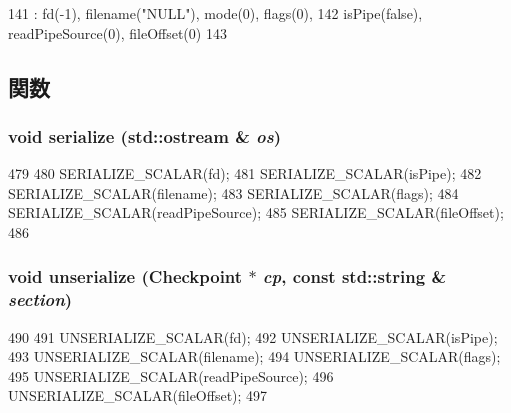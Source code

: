 \begin{DoxyCode}
141             : fd(-1), filename("NULL"), mode(0), flags(0),
142               isPipe(false), readPipeSource(0), fileOffset(0)
143         { }
\end{DoxyCode}


\subsection{関数}
\hypertarget{classProcess_1_1FdMap_a53e036786d17361be4c7320d39c99b84}{
\subsubsection[{serialize}]{\setlength{\rightskip}{0pt plus 5cm}void serialize (std::ostream \& {\em os})}}
\label{classProcess_1_1FdMap_a53e036786d17361be4c7320d39c99b84}



\begin{DoxyCode}
479 {
480     SERIALIZE_SCALAR(fd);
481     SERIALIZE_SCALAR(isPipe);
482     SERIALIZE_SCALAR(filename);
483     SERIALIZE_SCALAR(flags);
484     SERIALIZE_SCALAR(readPipeSource);
485     SERIALIZE_SCALAR(fileOffset);
486 }
\end{DoxyCode}
\hypertarget{classProcess_1_1FdMap_af22e5d6d660b97db37003ac61ac4ee49}{
\subsubsection[{unserialize}]{\setlength{\rightskip}{0pt plus 5cm}void unserialize ({\bf Checkpoint} $\ast$ {\em cp}, \/  const std::string \& {\em section})}}
\label{classProcess_1_1FdMap_af22e5d6d660b97db37003ac61ac4ee49}



\begin{DoxyCode}
490 {
491     UNSERIALIZE_SCALAR(fd);
492     UNSERIALIZE_SCALAR(isPipe);
493     UNSERIALIZE_SCALAR(filename);
494     UNSERIALIZE_SCALAR(flags);
495     UNSERIALIZE_SCALAR(readPipeSource);
496     UNSERIALIZE_SCALAR(fileOffset);
497 }
\end{DoxyCode}


